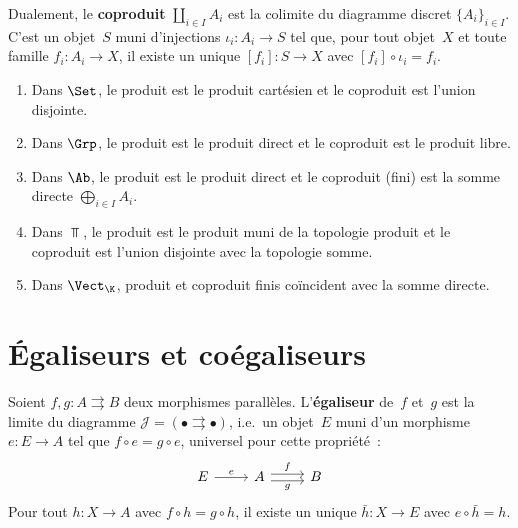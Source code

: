 \begin{definition}[Coproduit]\label{def:coproduit}
Dualement, le \textbf{coproduit} $\coprod_{i\in I}A_i$ est la colimite
du diagramme discret $\{A_i\}_{i\in I}$. C'est un objet~$S$ muni
d'injections $\iota_i\colon A_i\to S$ tel que, pour tout objet~$X$ et
toute famille $f_i\colon A_i\to X$, il existe un unique
$[f_i]\colon S\to X$ avec $[f_i]\circ\iota_i = f_i$.
\end{definition}

\begin{exemple}\label{ex:produits-concrets}
\begin{enumerate}[label=(\roman*)]
\item Dans $\Set$, le produit est le produit cartésien et le coproduit est
      l'union disjointe.
\item Dans $\Grp$, le produit est le produit direct et le coproduit est
      le produit libre.
\item Dans $\Ab$, le produit est le produit direct et le coproduit
      (fini) est la somme directe $\bigoplus_{i\in I}A_i$.
\item Dans $\Top$, le produit est le produit muni de la topologie produit
      et le coproduit est l'union disjointe avec la topologie somme.
\item Dans $\Vect_\K$, produit et coproduit finis coïncident avec
      la somme directe.
\end{enumerate}
\end{exemple}


\section{Égaliseurs et coégaliseurs}\label{sec:egaliseurs}

\begin{definition}[Égaliseur]\label{def:egaliseur}
Soient $f,g\colon A\rightrightarrows B$ deux morphismes parallèles.
L'\textbf{égaliseur} de~$f$ et~$g$ est la limite du diagramme
$\mathcal{J}=(\bullet\rightrightarrows\bullet)$, i.e.\ un objet~$E$
muni d'un morphisme $e\colon E\to A$ tel que $f\circ e = g\circ e$,
universel pour cette propriété~:
\[
\begin{tikzcd}
E \arrow[r, "e"] & A \arrow[r, shift left, "f"] \arrow[r, shift right, "g"'] & B
\end{tikzcd}
\]
Pour tout $h\colon X\to A$ avec $f\circ h = g\circ h$,
il existe un unique $\bar{h}\colon X\to E$ avec $e\circ\bar{h}=h$.
\end{definition}


